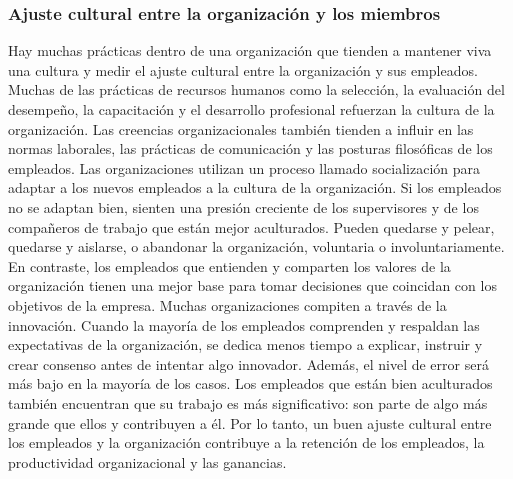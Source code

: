 \documentclass[10pt]{book}
\begin{document}
\subsubsection{Ajuste cultural entre la organización y los miembros}
Hay muchas prácticas dentro de una organización que tienden a mantener viva una cultura y medir el ajuste cultural entre la organización y sus empleados. Muchas de las prácticas de recursos humanos como la selección, la evaluación del desempeño, la capacitación y el desarrollo profesional refuerzan la cultura de la organización. Las creencias organizacionales también tienden a influir en las normas laborales, las prácticas de comunicación y las posturas filosóficas de los empleados. Las organizaciones utilizan un proceso llamado socialización para adaptar a los nuevos empleados a la cultura de la organización. Si los empleados no se adaptan bien, sienten una presión creciente de los supervisores y de los compañeros de trabajo que están mejor aculturados. Pueden quedarse y pelear, quedarse y aislarse, o abandonar la organización, voluntaria o involuntariamente.\\
En contraste, los empleados que entienden y comparten los valores de la organización tienen una mejor base para tomar decisiones que coincidan con los objetivos de la empresa. Muchas organizaciones compiten a través de la innovación. Cuando la mayoría de los empleados comprenden y respaldan las expectativas de la organización, se dedica menos tiempo a explicar, instruir y crear consenso antes de intentar algo innovador. Además, el nivel de error será más bajo en la mayoría de los casos. Los empleados que están bien aculturados también encuentran que su trabajo es más significativo: son parte de algo más grande que ellos y contribuyen a él. Por lo tanto, un buen ajuste cultural entre los empleados y la organización contribuye a la retención de los empleados, la productividad organizacional y las ganancias.
\end{document}
